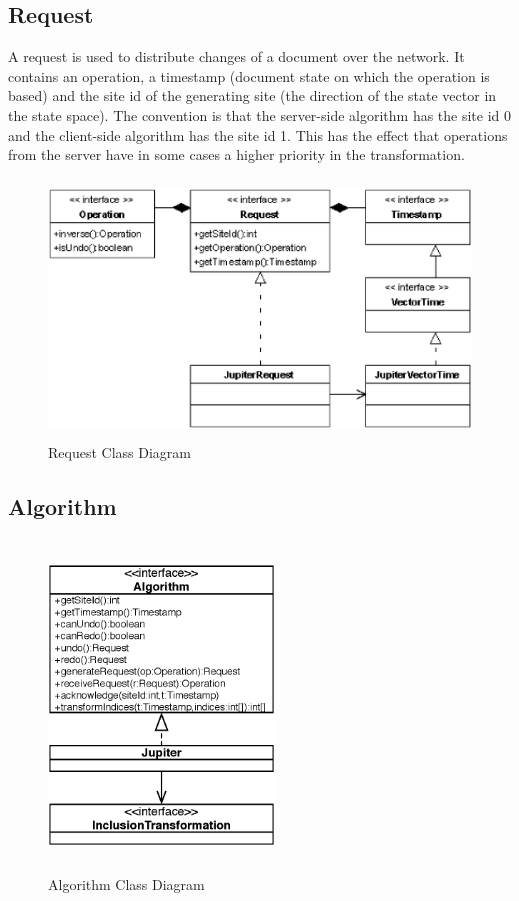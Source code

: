 \subsection{Request}
A request is used to distribute changes of a document over the network. It 
contains an operation, a timestamp (document 
state on which the operation is based) and the site id of the generating site
(the direction of the state vector in the state space). The convention is
that the server-side algorithm has the site id 0 and the client-side
algorithm has the site id 1. This has the effect that operations
from the server have in some cases a higher priority in the transformation.

\begin{figure}[H]
\centering
\includegraphics[height=6.87cm,width=12.09cm]{../images/finalreport/algorithm_request.eps}
\caption{Request Class Diagram}
\label{Request Class Diagram}
\end{figure}


\subsection{Algorithm}

\begin{figure}[H]
\centering
\includegraphics[width=6cm,height=8.78cm]{../images/finalreport/algorithm.eps}
\caption{Algorithm Class Diagram}
\label{fig:algorithm.uml}
\end{figure}


